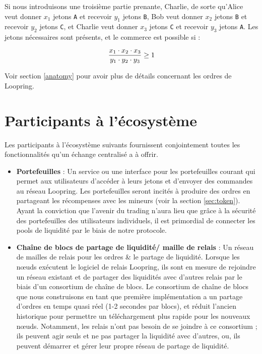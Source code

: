 \documentclass[UTF8,nofonts]{article}
\begin{document}
\begin{multicols}{2}
Si nous introduisons une troisième partie prenante, Charlie, de sorte qu'Alice veut donner $x_1$ jetons \verb|A| et recevoir $y_1$ jetons \verb|B|, Bob veut donner $x_2$ jetons \verb|B| et recevoir $y_2$ jetons \verb|C|, et Charlie veut donner $x_3$ jetons \verb|C| et recevoir $y_3$ jetons \verb|A|. Les jetons nécessaires sont présents, et le commerce est possible si :

\begin{equation}
{{x_1 \cdot x_2 \cdot x_3 \over y_1 \cdot y_2 \cdot y_3} \geq 1}
\end{equation}


Voir section \ref{anatomy} pour avoir plus de détails concernant les ordres de Loopring.



\section{Participants à l'écosystème\label{sec:ecosystem}}
Les participants à l'écosystème suivants fournissent conjointement toutes les fonctionnalités qu'un échange centralisé a à offrir. 

\begin{itemize}

\item \textbf{Portefeuilles} : Un service ou une interface pour les portefeuilles courant qui permet aux utilisateurs d'accéder à leurs jetons et d'envoyer des commandes au réseau Loopring. Les portefeuilles seront incités à produire des ordres en partageant les récompenses avec les mineurs (voir la section \ref{sec:token}). Ayant la conviction que l'avenir du trading n’aura lieu que grâce à la sécurité des portefeuilles des utilisateurs individuels, il est primordial de connecter les pools de liquidité par le biais de notre protocole.

\item \textbf{Chaîne de blocs de partage de liquidité/ maille de relais } : Un réseau de mailles de relais pour les ordres \& le partage de liquidité. Lorsque les nœuds exécutent le logiciel de relais Loopring, ils sont en mesure de rejoindre un réseau existant et de partager des liquidités avec d'autres relais par le biais d'un consortium de chaîne de blocs. Le consortium de chaîne de blocs que nous construisons en tant que première implémentation a un partage d'ordres en temps quasi réel (1-2 secondes par blocs), et réduit l'ancien historique pour permettre un téléchargement plus rapide pour les  nouveaux nœuds. Notamment, les relais n'ont pas besoin de se joindre à ce consortium ; ils peuvent agir seuls et ne pas partager la liquidité avec d'autres, ou, ils peuvent démarrer et gérer leur propre réseau de partage de liquidité.


\end{itemize}
\end{multicols}
\end{document}
